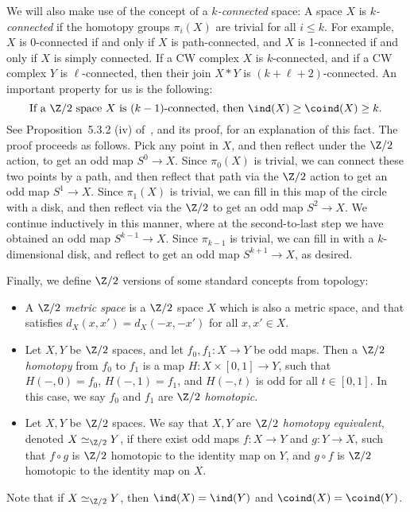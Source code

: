 \documentclass[11pt, reqno, english]{amsart}
\begin{document}
We will also make use of the concept of a \emph{$k$-connected} space:
A space $X$ is \emph{$k$-connected} if the homotopy groups $\pi_{i}(X)$ are trivial for all $i \le k$.
For example, $X$ is 0-connected if and only if $X$ is path-connected, and
$X$ is 1-connected if and only if $X$ is simply connected.
If a CW complex $X$ is $k$-connected, and if a CW complex $Y$ is $\ell$-connected, then their join $X * Y$ is $(k + \ell + 2)$-connected.
An important property for us is the following:
\begin{equation}
\label{eq:connected-coindex}
\text{ 
If a $\Z/2$ space $X$ is $(k - 1)$-connected, then $\ind(X) \ge \coind(X) \ge k$.
}
\end{equation}
See Proposition~5.3.2 (iv) of~\cite{matousek2003using}, and its proof, for an explanation of this fact.
The proof proceeds as follows.
Pick any point in $X$, and then reflect under the $\Z/2$ action, to get an odd map $S^0\to X$.
Since $\pi_0(X)$ is trivial, we can connect these two points by a path, and then reflect that path via the $\Z/2$ action to get an odd map $S^1\to X$.
Since $\pi_1(X)$ is trivial, we can fill in this map of the circle with a disk, and then reflect via the $\Z/2$ to get an odd map $S^2\to X$.
We continue inductively in this manner, where at the second-to-last step we have obtained an odd map $S^{k-1}\to X$.
Since $\pi_{k-1}$ is trivial, we can fill in with a $k$-dimensional disk, and reflect to get an odd map $S^{k+1}\to X$, as desired.

Finally, we define $\Z/2$ versions of some standard concepts from topology:
\begin{itemize}
\item
A \emph{$\Z/2$ metric space} is a $\Z/2$ space $X$ which is also a metric space, and that satisfies $d_X(x, x') = d_X(-x, -x')$ for all $x, x' \in X$.
\item
Let $X, Y$ be $\Z/2$ spaces, and let $f_{0}, f_{1} \colon X \to Y$ be odd maps.
Then a \emph{$\Z/2$ homotopy} from $f_{0}$ to $f_{1}$ is a map $H \colon X \times [0, 1] \to Y$, such that $H(-, 0) = f_{0}$, $H(-, 1) = f_{1}$, and $H(-, t)$ is odd for all $t \in [0, 1]$.
In this case, we say $f_{0}$ and $f_{1}$ are \emph{$\Z/2$ homotopic}.
\item
Let $X, Y$ be $\Z/2$ spaces.
We say that $X, Y$ are \emph{$\Z/2$ homotopy equivalent}, denoted $X \simeq_{\Z/2} Y$, if there exist odd maps $f \colon X \to Y$ and $g \colon Y \to X$, such that $f \circ g$ is $\Z/2$ homotopic to the identity map on $Y$, and $g \circ f$ is $\Z/2$ homotopic to the identity map on $X$.
\end{itemize}
Note that if $X \simeq_{\Z/2} Y$, then $\ind(X) = \ind(Y)$ and $\coind(X) = \coind(Y)$.
\end{document}
